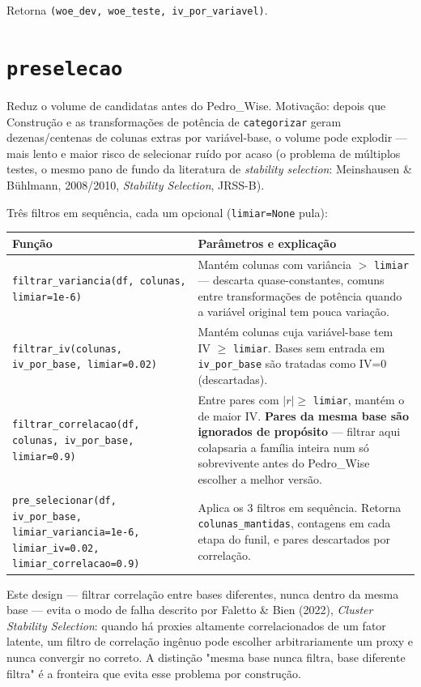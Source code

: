 \documentclass[11pt]{article}
\begin{document}
Retorna \texttt{(woe\_dev, woe\_teste, iv\_por\_variavel)}.

\section{\texttt{preselecao}}

Reduz o volume de candidatas antes do Pedro\_Wise. Motivação: depois que
Construção e as transformações de potência de \texttt{categorizar} geram
dezenas/centenas de colunas extras por variável-base, o volume pode
explodir --- mais lento e maior risco de selecionar ruído por acaso (o
problema de múltiplos testes, o mesmo pano de fundo da literatura de
\emph{stability selection}: Meinshausen \& B\"uhlmann, 2008/2010,
\emph{Stability Selection}, JRSS-B).

Três filtros em sequência, cada um opcional (\texttt{limiar=None} pula):

\begin{longtable}{P{4cm}P{9.5cm}}
\toprule
\textbf{Função} & \textbf{Parâmetros e explicação} \\
\midrule
\endhead
\texttt{filtrar\_variancia(df, colunas, limiar=1e-6)} &
Mantém colunas com variância $>$ \texttt{limiar} --- descarta
quase-constantes, comuns entre transformações de potência quando a
variável original tem pouca variação. \\[0.4em]
\texttt{filtrar\_iv(colunas, iv\_por\_base, limiar=0.02)} &
Mantém colunas cuja variável-base tem IV $\geq$ \texttt{limiar}. Bases sem
entrada em \texttt{iv\_por\_base} são tratadas como IV=0 (descartadas). \\[0.4em]
\texttt{filtrar\_correlacao(df, colunas, iv\_por\_base, limiar=0.9)} &
Entre pares com $|r| \geq$ \texttt{limiar}, mantém o de maior IV.
\textbf{Pares da mesma base são ignorados de propósito} --- filtrar aqui
colapsaria a família inteira num só sobrevivente antes do Pedro\_Wise
escolher a melhor versão. \\[0.4em]
\texttt{pre\_selecionar(df, iv\_por\_base, limiar\_variancia=1e-6, limiar\_iv=0.02, limiar\_correlacao=0.9)} &
Aplica os 3 filtros em sequência. Retorna \texttt{colunas\_mantidas},
contagens em cada etapa do funil, e pares descartados por correlação. \\
\bottomrule
\end{longtable}

Este design --- filtrar correlação entre bases diferentes, nunca dentro da
mesma base --- evita o modo de falha descrito por Faletto \& Bien (2022),
\emph{Cluster Stability Selection}: quando há
proxies altamente correlacionados de um fator latente, um filtro de
correlação ingênuo pode escolher arbitrariamente um proxy e nunca convergir
no correto. A distinção "mesma base nunca filtra, base diferente filtra" é
a fronteira que evita esse problema por construção.
\end{document}
